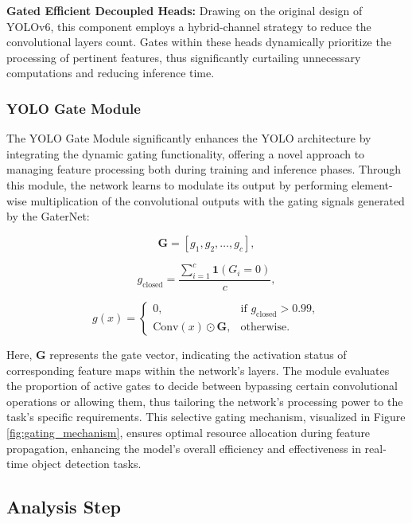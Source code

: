 \textbf{Gated Efficient Decoupled Heads:} Drawing on the original design of YOLOv6, this component employs a hybrid-channel strategy to reduce the convolutional layers count. Gates within these heads dynamically prioritize the processing of pertinent features, thus significantly curtailing unnecessary computations and reducing inference time.

\subsubsection{YOLO Gate Module}
The YOLO Gate Module significantly enhances the YOLO architecture by integrating the dynamic gating functionality, offering a novel approach to managing feature processing both during training and inference phases. Through this module, the network learns to modulate its output by performing element-wise multiplication of the convolutional outputs with the gating signals generated by the GaterNet:

\begin{equation}
\mathbf{G} = [g_1, g_2, \ldots, g_c], \label{eq:G_vector}
\end{equation}

\begin{equation}
g_{\text{closed}} = \frac{\sum_{i=1}^{c} \mathbf{1}(G_i = 0)}{c}, \label{eq:g_closed}
\end{equation}

\begin{equation}
g(x) = 
\begin{cases} 
0, & \text{if } g_{\text{closed}} > 0.99, \\
\text{Conv}(x) \odot \mathbf{G}, & \text{otherwise}.
\end{cases} \label{eq:conditional_gating}
\end{equation}

Here, \(\mathbf{G}\) represents the gate vector, indicating the activation status of corresponding feature maps within the network's layers. The module evaluates the proportion of active gates to decide between bypassing certain convolutional operations or allowing them, thus tailoring the network's processing power to the task's specific requirements. This selective gating mechanism, visualized in Figure \ref{fig:gating_mechanism}, ensures optimal resource allocation during feature propagation, enhancing the model's overall efficiency and effectiveness in real-time object detection tasks.

\subsection{Analysis Step}

